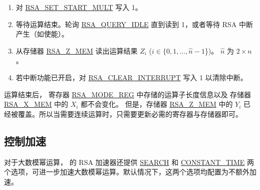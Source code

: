 \documentclass[main\_\_CN.tex]{subfiles}
\begin{document}
\begin{enumerate}
        只需按运算子长度向各存储器写入有效数据；超出该长度的数据将被忽略。

    \item 对 \hyperref[fielddesc:RSASETSTARTMULT]{RSA\_SET\_START\_MULT} 写入 1。

    \item 等待运算结束。轮询 \hyperref[fielddesc:RSAQUERYIDLE]{RSA\_QUERY\_IDLE} 直到读到 1，或者等待 RSA 中断产生（如使能）。

    \item 从存储器 \hyperref[regdesc:RSAmemory]{RSA\_Z\_MEM} 读出运算结果 \begin{math}Z_{i}\end{math} (\begin{math}i \in \{ 0, 1, \dots, \hat{n}-1 \end{math}\})。
        \begin{math}\hat{n}\end{math} 为  \begin{math} 2 \times n \end{math} 。

    \item 若中断功能已开启，对 \hyperref[fielddesc:RSACLEARINTERRUPT]{RSA\_CLEAR\_INTERRUPT} 写入 1 以清除中断。

\end{enumerate}

运算结束后，
寄存器 \hyperref[regdesc:RSAMODEREG]{RSA\_MODE\_REG} 中存储的运算子长度信息以及
存储器 \hyperref[regdesc:RSAmemory]{RSA\_X\_MEM} 中的 \begin{math}{X}_{i}\end{math} 都不会变化。
但是，存储器 \hyperref[regdesc:RSAmemory]{RSA\_Z\_MEM} 中的 \begin{math}{Y}_{i}\end{math}
已经被覆盖。所以当需要连续运算时，只需要更新必需的寄存器与存储器即可。

\subsection{控制加速}\label{sec:Accelerate options}

对于大数模幂运算，\chipname{} 的 RSA 加速器还提供 \hyperref[regdesc:RSASEARCHENABLEREG]{SEARCH} 和 \hyperref[regdesc:RSACONSTANTTIMEREG]{CONSTANT\_TIME} 两个选项，可进一步加速大数模幂运算。默认情况下，这两个选项均配置为不额外加速。
\end{document}
